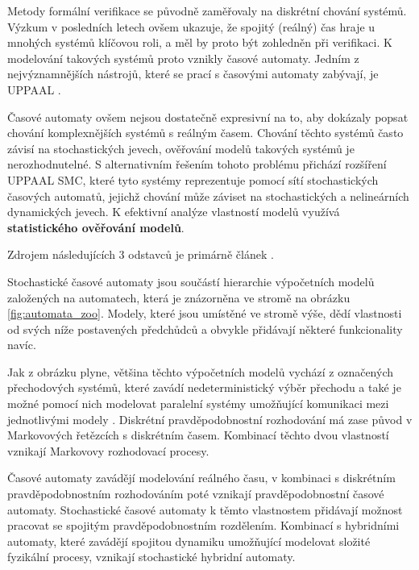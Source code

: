 Metody formální verifikace se původně zaměřovaly na diskrétní chování systémů. Výzkum v posledních letech ovšem ukazuje, že spojitý (reálný) čas hraje u mnohých systémů klíčovou roli, a měl by proto být zohledněn při verifikaci. K modelování takových systémů proto vznikly časové automaty. Jedním z nejvýznamnějších nástrojů, které se prací s časovými automaty zabývají, je UPPAAL \cite{uppaal_smc}.

Časové automaty ovšem nejsou dostatečně expresivní na to, aby dokázaly popsat chování komplexnějších systémů s reálným časem. Chování těchto systémů často závisí na stochastických jevech, ověřování modelů takových systémů je nerozhodnutelné. S alternativním řešením tohoto problému přichází rozšíření UPPAAL SMC, které tyto systémy reprezentuje pomocí sítí stochastických časových automatů, jejichž chování může záviset na stochastických a nelineárních dynamických jevech. K efektivní analýze vlastností modelů využívá \textbf{statistického ověřování modelů}.

Zdrojem následujících 3 odstavců je primárně článek \cite{automata_zoo}. 

Stochastické časové automaty jsou součástí hierarchie výpočetních modelů založených na automatech, která je znázorněna ve stromě na obrázku \ref{fig:automata_zoo}. Modely, které jsou umístěné ve stromě výše, dědí vlastnosti od svých níže postavených předchůdců a obvykle přidávají některé funkcionality navíc.

Jak z obrázku plyne, většina těchto výpočetních modelů vychází z označených přechodových systémů, které zavádí nedeterministický výběr přechodu a také je možné pomocí nich modelovat paralelní systémy umožňující komunikaci mezi jednotlivými modely \cite{mc_principles}. Diskrétní pravděpodobnostní rozhodování má zase původ v Markovových řetězcích s diskrétním časem. Kombinací těchto dvou vlastností vznikají Markovovy rozhodovací procesy. 

Časové automaty zavádějí modelování reálného času, v kombinaci s diskrétním pravděpodobnostním rozhodováním poté vznikají pravděpodobnostní časové automaty. Stochastické časové automaty k těmto vlastnostem přidávají možnost pracovat se spojitým pravděpodobnostním rozdělením. Kombinací s hybridními automaty, které zavádějí spojitou dynamiku umožňující modelovat složité fyzikální procesy, vznikají stochastické hybridní automaty.

